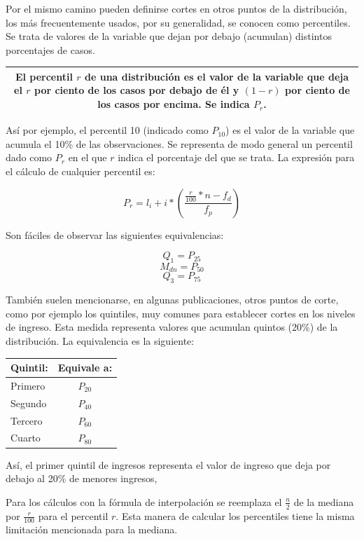 \documentclass[]{book}
\begin{document}
Por el mismo camino pueden definirse cortes en otros puntos de la
distribución, los más frecuentemente usados, por su generalidad, se
conocen como percentiles. Se trata de valores de la variable que dejan
por debajo (acumulan) distintos porcentajes de casos.

\begin{longtable}[]{@{}c@{}}
\toprule
\endhead
\begin{minipage}[t]{0.97\columnwidth}\centering
El \textbf{percentil \(r\)} de una distribución es el valor de la variable que deja el \(r\) por ciento de los casos por debajo de él y \((1-r)\) por ciento de los casos por encima. Se indica \(P_r\).\strut
\end{minipage}\tabularnewline
\bottomrule
\end{longtable}

Así por ejemplo, el percentil 10 (indicado como \(P_{10}\)) es el valor de
la variable que acumula el 10\% de las observaciones. Se representa de
modo general un percentil dado como \(P_r\) en el que \(r\) indica el
porcentaje del que se trata. La expresión para el cálculo de cualquier
percentil es:

\[P_{r} = l_{i} + i*\left( \frac{\frac{r}{100}*n - f_{d}}{f_{p}} \right)\]

Son fáciles de observar las siguientes equivalencias:

\[Q_{1} = P_{25}\]
\[M_{dn} = P_{50}\]
\[Q_{3} = P_{75}\]

También suelen mencionarse, en algunas publicaciones, otros puntos de
corte, como por ejemplo los quintiles, muy comunes para establecer cortes en los niveles de ingreso. Esta medida representa valores
que acumulan quintos (20\%) de la distribución. La equivalencia es la
siguiente:

\begin{longtable}[]{@{}lc@{}}
\toprule
Quintil: & Equivale a:\tabularnewline
\midrule
\endhead
Primero & \(P_{20}\)\tabularnewline
Segundo & \(P_{40}\)\tabularnewline
Tercero & \(P_{60}\)\tabularnewline
Cuarto & \(P_{80}\)\tabularnewline
\bottomrule
\end{longtable}

Así, el primer quintil de ingresos representa el valor de ingreso que deja por debajo al 20\% de menores ingresos,

Para los cálculos con la fórmula de interpolación se reemplaza el
\(\frac{n}{2}\) de la mediana por \(\frac{r}{100}\) para el percentil \(r\).
Esta manera de calcular los percentiles tiene la misma limitación
mencionada para la mediana.
\end{document}
